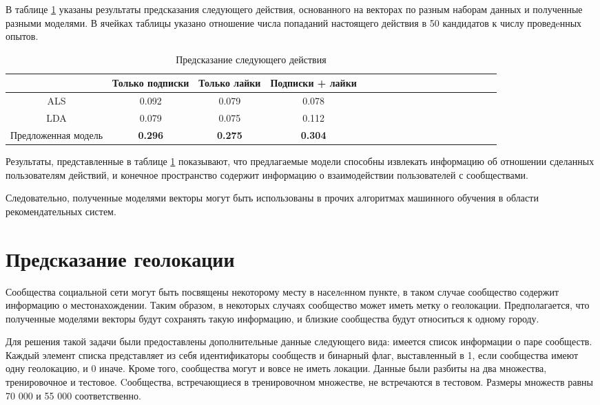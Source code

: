 \documentclass[times,specification,annotation]{itmo-student-thesis}
\begin{document}
В таблице \ref {tab2-next-action} указаны результаты предсказания следующего действия, основанного на векторах по разным наборам данных и полученные разными моделями. В ячейках таблицы указано отношение числа попаданий настоящего действия в 50 кандидатов к числу проведeнных опытов.  

\begin{table}[!h]
\caption{Предсказание следующего действия} \label{tab2-next-action}
\centering
\begin{tabular}{|*{18}{c|}}\hline
  & Только подписки  & Только лайки & Подписки + лайки \\\hline
ALS                        & 0.092 & 0.079  & 0.078 \\\hline
LDA                       & 0.079 & 0.075  & 0.112 \\\hline
Предложенная модель & \textbf{0.296} & \textbf{0.275} & \textbf{0.304} \\\hline
\end{tabular}
\end{table}

Результаты, представленные в таблице \ref{tab2-next-action} показывают, что предлагаемые модели способны извлекать информацию об отношении сделанных пользователям действий, и конечное пространство содержит информацию о взаимодействии пользователей с сообществами. 

Следовательно, полученные моделями векторы могут быть использованы в прочих алгоритмах машинного обучения в области рекомендательных систем.

\section{Предсказание геолокации} \label{sec:geo}

Сообщества социальной сети могут быть посвящены некоторому месту в населeнном пункте, в таком случае сообщество содержит информацию о местонахождении. Таким образом, в некоторых случаях сообщество может иметь метку о геолокации. Предполагается, что полученные моделями векторы будут сохранять такую информацию, и близкие сообщества будут относиться к одному городу. 

Для решения такой задачи были предоставлены дополнительные данные следующего вида: имеется список информации о паре сообществ. Каждый элемент списка представляет из себя идентификаторы сообществ и бинарный флаг, выставленный в 1, если сообщества имеют одну геолокацию, и 0 иначе. Кроме того, сообщества могут и вовсе не иметь локации. Данные были разбиты на два множества, тренировочное и тестовое. Cообщества, встречающиеся в тренировочном множестве, не встречаются в тестовом. Размеры множеств равны 70 000 и 55 000 соответственно.
\end{document}
